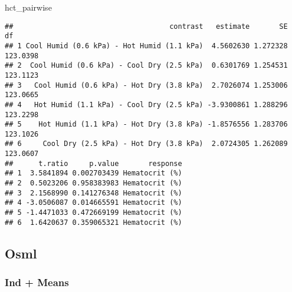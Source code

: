 \documentclass[
]{article}
\newenvironment{Shaded}{\begin{snugshade}}{\end{snugshade}}
\newcommand{\NormalTok}[1]{#1}
\begin{document}
\begin{Shaded}
\begin{Highlighting}[]
\NormalTok{hct\_pairwise}
\end{Highlighting}
\end{Shaded}

\begin{verbatim}
##                                     contrast   estimate       SE       df
## 1 Cool Humid (0.6 kPa) - Hot Humid (1.1 kPa)  4.5602630 1.272328 123.0398
## 2  Cool Humid (0.6 kPa) - Cool Dry (2.5 kPa)  0.6301769 1.254531 123.1123
## 3   Cool Humid (0.6 kPa) - Hot Dry (3.8 kPa)  2.7026074 1.253006 123.0665
## 4   Hot Humid (1.1 kPa) - Cool Dry (2.5 kPa) -3.9300861 1.288296 123.2298
## 5    Hot Humid (1.1 kPa) - Hot Dry (3.8 kPa) -1.8576556 1.283706 123.1026
## 6     Cool Dry (2.5 kPa) - Hot Dry (3.8 kPa)  2.0724305 1.262089 123.0607
##      t.ratio     p.value       response
## 1  3.5841894 0.002703439 Hematocrit (%)
## 2  0.5023206 0.958383983 Hematocrit (%)
## 3  2.1568990 0.141276348 Hematocrit (%)
## 4 -3.0506087 0.014665591 Hematocrit (%)
## 5 -1.4471033 0.472669199 Hematocrit (%)
## 6  1.6420637 0.359065321 Hematocrit (%)
\end{verbatim}

\hypertarget{osml}{%
\subsection{Osml}\label{osml}}

\hypertarget{ind-means-2}{%
\subsubsection{Ind + Means}\label{ind-means-2}}
\end{document}

